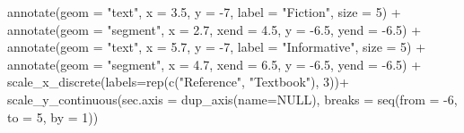 \documentclass[
  letterpaper,
  DIV=11,
  numbers=noendperiod]{scrreprt}
\newenvironment{Shaded}{\begin{snugshade}}{\end{snugshade}}
\newcommand{\AttributeTok}[1]{\textcolor[rgb]{0.40,0.45,0.13}{#1}}
\newcommand{\ConstantTok}[1]{\textcolor[rgb]{0.56,0.35,0.01}{#1}}
\newcommand{\DecValTok}[1]{\textcolor[rgb]{0.68,0.00,0.00}{#1}}
\newcommand{\FloatTok}[1]{\textcolor[rgb]{0.68,0.00,0.00}{#1}}
\newcommand{\FunctionTok}[1]{\textcolor[rgb]{0.28,0.35,0.67}{#1}}
\newcommand{\NormalTok}[1]{\textcolor[rgb]{0.00,0.23,0.31}{#1}}
\newcommand{\SpecialCharTok}[1]{\textcolor[rgb]{0.37,0.37,0.37}{#1}}
\newcommand{\StringTok}[1]{\textcolor[rgb]{0.13,0.47,0.30}{#1}}
\begin{document}
\begin{Shaded}
\begin{Highlighting}[]
  \FunctionTok{annotate}\NormalTok{(}\AttributeTok{geom =} \StringTok{"text"}\NormalTok{, }\AttributeTok{x =} \FloatTok{3.5}\NormalTok{, }\AttributeTok{y =} \SpecialCharTok{{-}}\DecValTok{7}\NormalTok{, }\AttributeTok{label =} \StringTok{"Fiction"}\NormalTok{, }\AttributeTok{size =} \DecValTok{5}\NormalTok{) }\SpecialCharTok{+}
  \FunctionTok{annotate}\NormalTok{(}\AttributeTok{geom =} \StringTok{"segment"}\NormalTok{, }\AttributeTok{x =} \FloatTok{2.7}\NormalTok{, }\AttributeTok{xend =} \FloatTok{4.5}\NormalTok{, }\AttributeTok{y =} \SpecialCharTok{{-}}\FloatTok{6.5}\NormalTok{, }\AttributeTok{yend =} \SpecialCharTok{{-}}\FloatTok{6.5}\NormalTok{) }\SpecialCharTok{+}
  \FunctionTok{annotate}\NormalTok{(}\AttributeTok{geom =} \StringTok{"text"}\NormalTok{, }\AttributeTok{x =} \FloatTok{5.7}\NormalTok{, }\AttributeTok{y =} \SpecialCharTok{{-}}\DecValTok{7}\NormalTok{, }\AttributeTok{label =} \StringTok{"Informative"}\NormalTok{, }\AttributeTok{size =} \DecValTok{5}\NormalTok{) }\SpecialCharTok{+}
  \FunctionTok{annotate}\NormalTok{(}\AttributeTok{geom =} \StringTok{"segment"}\NormalTok{, }\AttributeTok{x =} \FloatTok{4.7}\NormalTok{, }\AttributeTok{xend =} \FloatTok{6.5}\NormalTok{, }\AttributeTok{y =} \SpecialCharTok{{-}}\FloatTok{6.5}\NormalTok{, }\AttributeTok{yend =} \SpecialCharTok{{-}}\FloatTok{6.5}\NormalTok{) }\SpecialCharTok{+}
  \FunctionTok{scale\_x\_discrete}\NormalTok{(}\AttributeTok{labels=}\FunctionTok{rep}\NormalTok{(}\FunctionTok{c}\NormalTok{(}\StringTok{"Reference"}\NormalTok{, }\StringTok{"Textbook"}\NormalTok{), }\DecValTok{3}\NormalTok{))}\SpecialCharTok{+}
  \FunctionTok{scale\_y\_continuous}\NormalTok{(}\AttributeTok{sec.axis =} \FunctionTok{dup\_axis}\NormalTok{(}\AttributeTok{name=}\ConstantTok{NULL}\NormalTok{), }\AttributeTok{breaks =} \FunctionTok{seq}\NormalTok{(}\AttributeTok{from =} \SpecialCharTok{{-}}\DecValTok{6}\NormalTok{, }\AttributeTok{to =} \DecValTok{5}\NormalTok{, }\AttributeTok{by =} \DecValTok{1}\NormalTok{))}
\end{Highlighting}
\end{Shaded}
\end{document}
